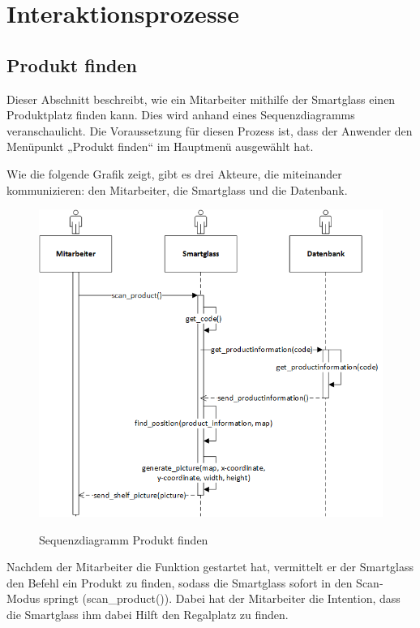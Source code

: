 \section{Interaktionsprozesse}

\subsection{Produkt finden}
\label{sec:produkt_finden}
Dieser Abschnitt beschreibt, wie ein Mitarbeiter mithilfe der Smartglass einen Produktplatz finden kann. Dies wird anhand eines Sequenzdiagramms veranschaulicht. Die Voraussetzung für diesen Prozess ist, dass der Anwender den Menüpunkt „Produkt finden“ im Hauptmenü ausgewählt hat.

Wie die folgende Grafik zeigt, gibt es drei Akteure, die miteinander kommunizieren: den Mitarbeiter, die Smartglass und die Datenbank.
\begin{figure}[H]
	\centering
	{\includegraphics[scale=0.8]{Bilder/Abbildungen/SMAR_produkt_finden_Sequenzdiagramm.png}}
	\caption{Sequenzdiagramm Produkt finden}
	\label{fig:jwt_encode}
\end{figure}
Nachdem der Mitarbeiter die Funktion gestartet hat, vermittelt er der Smartglass den Befehl ein Produkt zu finden, sodass die Smartglass sofort in den Scan-Modus springt (scan\_product()). Dabei hat der Mitarbeiter die Intention, dass die Smartglass ihm dabei Hilft den Regalplatz zu finden.

